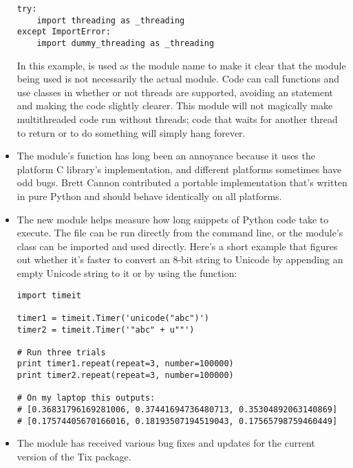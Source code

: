 \documentclass{howto}
\begin{document}
\begin{itemize}
\begin{verbatim}
try:
    import threading as _threading
except ImportError:
    import dummy_threading as _threading
\end{verbatim}

In this example,  is used as the module name to make
it clear that the module being used is not necessarily the actual
 module. Code can call functions and use classes in
 whether or not threads are supported, avoiding an
 statement and making the code slightly clearer.  This
module will not magically make multithreaded code run without threads;
code that waits for another thread to return or to do something will
simply hang forever. 

\item The  module's  function has
long been an annoyance because it uses the platform C library's
 implementation, and different platforms
sometimes have odd bugs.  Brett Cannon contributed a portable
implementation that's written in pure Python and should behave
identically on all platforms.

\item The new  module helps measure how long snippets
of Python code take to execute.  The  file can be run
directly from the command line, or the module's  class
can be imported and used directly.  Here's a short example that
figures out whether it's faster to convert an 8-bit string to Unicode
by appending an empty Unicode string to it or by using the
 function:

\begin{verbatim}
import timeit

timer1 = timeit.Timer('unicode("abc")')
timer2 = timeit.Timer('"abc" + u""')

# Run three trials
print timer1.repeat(repeat=3, number=100000)
print timer2.repeat(repeat=3, number=100000)

# On my laptop this outputs:
# [0.36831796169281006, 0.37441694736480713, 0.35304892063140869]
# [0.17574405670166016, 0.18193507194519043, 0.17565798759460449]
\end{verbatim}

\item The  module has received various bug fixes and
updates for the current version of the Tix package.


\end{itemize}
\end{document}
